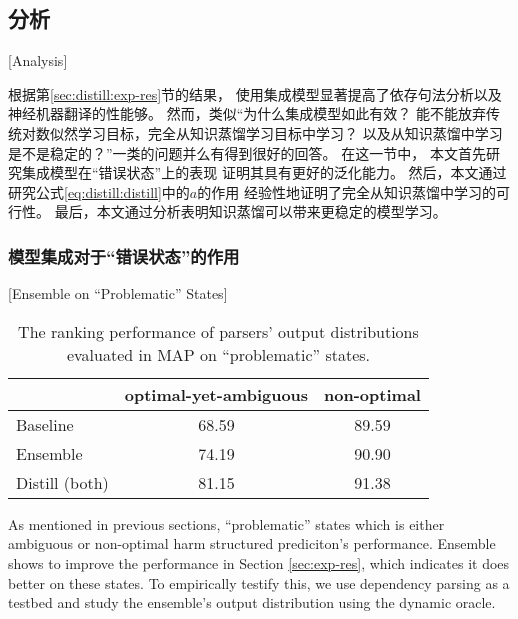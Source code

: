 \subsection{分析}[Analysis]\label{sec:analysis}

根据第\ref{sec:distill:exp-res}节的结果，
使用集成模型显著提高了依存句法分析以及神经机器翻译的性能够。
然而，类似``为什么集成模型如此有效？
能不能放弃传统对数似然学习目标，完全从知识蒸馏学习目标中学习？
以及从知识蒸馏中学习是不是稳定的？''一类的问题并么有得到很好的回答。
在这一节中，
本文首先研究集成模型在``错误状态''上的表现
证明其具有更好的泛化能力。
然后，本文通过研究公式\ref{eq:distill:distill}中的$a$的作用
经验性地证明了完全从知识蒸馏中学习的可行性。
最后，本文通过分析表明知识蒸馏可以带来更稳定的模型学习。

\subsubsection{模型集成对于``错误状态''的作用}[Ensemble on ``Problematic'' States]\label{sec:distill:ens-on-states}
\begin{table}[t]
	\centering
	\begin{tabular}{l  c c}
		\hline
		& optimal-yet-ambiguous & non-optimal \\
		\hline
		Baseline & 68.59 & 89.59\\
		Ensemble & 74.19 & 90.90 \\
		Distill (both) & 81.15 & 91.38 \\
		\hline
	\end{tabular}
	\caption{The ranking performance of parsers' 
		output distributions evaluated in MAP on
		``problematic'' states.}\label{tbl:state-ana}
\end{table}
As mentioned in previous sections, ``problematic'' states
which is either ambiguous or non-optimal harm structured prediciton's 
performance.
Ensemble shows to improve the performance in Section \ref{sec:exp-res}, 
which indicates it does better on these states.
To empirically testify this, we use dependency parsing as a testbed
and study the ensemble's output distribution
using the dynamic oracle.

